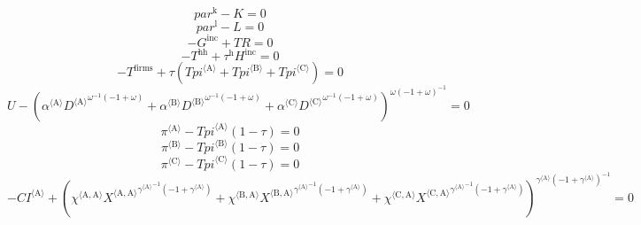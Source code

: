 \begin{equation}
{p\!a\!r}^{\mathrm{k}} - K = 0
\end{equation}
\begin{equation}
{p\!a\!r}^{\mathrm{l}} - L = 0
\end{equation}
\begin{equation}
-G^{\mathrm{inc}} + {T\!R} = 0
\end{equation}
\begin{equation}
-T^{\mathrm{hh}} + {\tau^{\mathrm{h}}} {H^{\mathrm{inc}}} = 0
\end{equation}
\begin{equation}
-T^{\mathrm{firms}} + {\tau} \left({{T\!p\!i}}^{\langle \mathrm{A}\rangle} + {{T\!p\!i}}^{\langle \mathrm{B}\rangle} + {{T\!p\!i}}^{\langle \mathrm{C}\rangle}\right) = 0
\end{equation}
\begin{equation}
U - \left({{\alpha}^{\langle \mathrm{\mathrm{A}}\rangle}} {{{D}^{\langle \mathrm{A}\rangle}}^{{\omega}^{-1} \left(-1 + \omega\right)}} + {{\alpha}^{\langle \mathrm{\mathrm{B}}\rangle}} {{{D}^{\langle \mathrm{B}\rangle}}^{{\omega}^{-1} \left(-1 + \omega\right)}} + {{\alpha}^{\langle \mathrm{\mathrm{C}}\rangle}} {{{D}^{\langle \mathrm{C}\rangle}}^{{\omega}^{-1} \left(-1 + \omega\right)}}\right)^{{\omega} \left(-1 + \omega\right)^{-1}} = 0
\end{equation}
\begin{equation}
{\pi}^{\langle \mathrm{A}\rangle} - {{{T\!p\!i}}^{\langle \mathrm{A}\rangle}} \left(1 - \tau\right) = 0
\end{equation}
\begin{equation}
{\pi}^{\langle \mathrm{B}\rangle} - {{{T\!p\!i}}^{\langle \mathrm{B}\rangle}} \left(1 - \tau\right) = 0
\end{equation}
\begin{equation}
{\pi}^{\langle \mathrm{C}\rangle} - {{{T\!p\!i}}^{\langle \mathrm{C}\rangle}} \left(1 - \tau\right) = 0
\end{equation}
\begin{equation}
-{{C\!I}}^{\langle \mathrm{A}\rangle} + \left({{\chi}^{\langle \mathrm{\mathrm{A}},\mathrm{\mathrm{A}}\rangle}} {{{X}^{\langle \mathrm{A},\mathrm{A}\rangle}}^{{{\gamma}^{\langle \mathrm{\mathrm{A}}\rangle}}^{-1} \left(-1 + {\gamma}^{\langle \mathrm{\mathrm{A}}\rangle}\right)}} + {{\chi}^{\langle \mathrm{\mathrm{B}},\mathrm{\mathrm{A}}\rangle}} {{{X}^{\langle \mathrm{B},\mathrm{A}\rangle}}^{{{\gamma}^{\langle \mathrm{\mathrm{A}}\rangle}}^{-1} \left(-1 + {\gamma}^{\langle \mathrm{\mathrm{A}}\rangle}\right)}} + {{\chi}^{\langle \mathrm{\mathrm{C}},\mathrm{\mathrm{A}}\rangle}} {{{X}^{\langle \mathrm{C},\mathrm{A}\rangle}}^{{{\gamma}^{\langle \mathrm{\mathrm{A}}\rangle}}^{-1} \left(-1 + {\gamma}^{\langle \mathrm{\mathrm{A}}\rangle}\right)}}\right)^{{{\gamma}^{\langle \mathrm{\mathrm{A}}\rangle}} \left(-1 + {\gamma}^{\langle \mathrm{\mathrm{A}}\rangle}\right)^{-1}} = 0
\end{equation}
